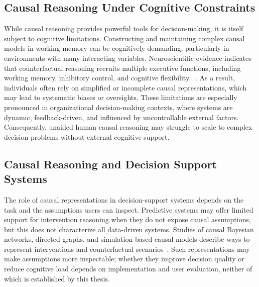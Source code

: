 \documentclass{sfuthesis}
\begin{document}
\subsection{Causal Reasoning Under Cognitive Constraints}
While causal reasoning provides powerful tools for decision-making, it is itself subject to cognitive limitations. Constructing and maintaining complex causal models in working memory can be cognitively demanding, particularly in environments with many interacting variables. Neuroscientific evidence indicates that counterfactual reasoning recruits multiple executive functions, including working memory, inhibitory control, and cognitive flexibility ~\cite{van_hoeck_cognitive_2015}. As a result, individuals often rely on simplified or incomplete causal representations, which may lead to systematic biases or oversights. These limitations are especially pronounced in organizational decision-making contexts, where systems are dynamic, feedback-driven, and influenced by uncontrollable external factors. Consequently, unaided human causal reasoning may struggle to scale to complex decision problems without external cognitive support.
\subsection{Causal Reasoning and Decision Support Systems}
The role of causal representations in decision-support systems depends on the task and the assumptions users can inspect. Predictive systems may offer limited support for intervention reasoning when they do not expose causal assumptions, but this does not characterize all data-driven systems. Studies of causal Bayesian networks, directed graphs, and simulation-based causal models describe ways to represent interventions and counterfactual scenarios~\cite{jeunen_consequencescausality_2022,kyrimi_counterfactual_2025}. Such representations may make assumptions more inspectable; whether they improve decision quality or reduce cognitive load depends on implementation and user evaluation, neither of which is established by this thesis.
\end{document}
